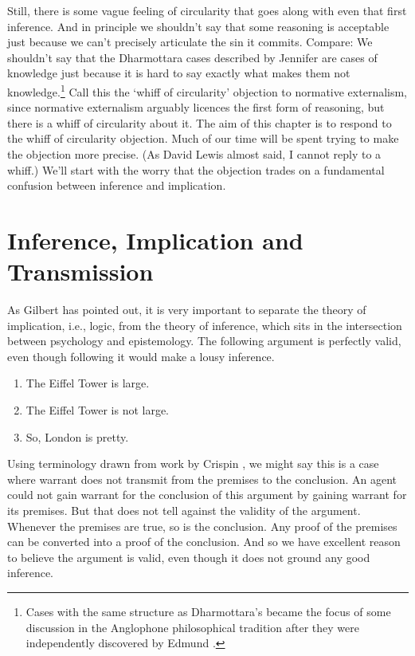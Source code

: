 Still, there is some vague feeling of circularity that goes along with even that first inference. And in principle we shouldn't say that some reasoning is acceptable just because we can't precisely articulate the sin it commits. Compare: We shouldn't say that the Dharmottara cases described by Jennifer \citet[57]{Nagel2014} are cases of knowledge just because it is hard to say exactly what makes them not knowledge.\footnote{Cases with the same structure as Dharmottara's became the focus of some discussion in the Anglophone philosophical tradition after they were independently discovered by Edmund \citet{Gettier1963}.} Call this the `whiff of circularity' objection to normative externalism, since normative externalism arguably licences the first form of reasoning, but there is a whiff of circularity about it. The aim of this chapter is to respond to the whiff of circularity objection. Much of our time will be spent trying to make the objection more precise. (As David Lewis almost said, I cannot reply to a whiff.) We'll start with the worry that the objection trades on a fundamental confusion between inference and implication.

\section{Inference, Implication and Transmission}
\label{inferenceimplicationandtransmission}

As Gilbert \citet{Harman1986} has pointed out, it is very important to separate the theory of implication, i.e., logic, from the theory of inference, which sits in the intersection between psychology and epistemology. The following argument is perfectly valid, even though following it would make a lousy inference.

\begin{enumerate}
\item{} The Eiffel Tower is large.

\item{} The Eiffel Tower is not large.

\item{} So, London is pretty.

\end{enumerate}
Using terminology drawn from work by Crispin \citet{Wright2000, Wright2002}, we might say this is a case where warrant does not transmit from the premises to the conclusion. An agent could not gain warrant for the conclusion of this argument by gaining warrant for its premises. But that does not tell against the validity of the argument. Whenever the premises are true, so is the conclusion. Any proof of the premises can be converted into a proof of the conclusion. And so we have excellent reason to believe the argument is valid, even though it does not ground any good inference.

